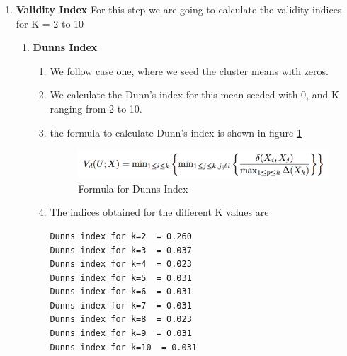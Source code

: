\documentclass[10pt, letterpaper]{article}
\begin{document}
\begin{enumerate}
\newpage

\item \textbf{Validity Index} For this step we are going to calculate the validity indices for K = 2 to 10
\begin{enumerate}

\item \textbf{Dunns Index}
\begin{enumerate}
\item We follow case one, where we seed the cluster means with zeros.
\item We calculate the Dunn's index for this mean seeded with 0, and K ranging from 2 to 10.
\item the formula to calculate Dunn's index is shown in figure \ref{fig:dunn}
 	\begin{figure}[h!]
	\centering
	\includegraphics[scale=0.75]{dunnsindex}
	\caption{Formula  for Dunns Index}
	\label {fig:dunn}
	\end{figure}
\newpage
\item The indices obtained for the different K values are
\begin{verbatim}
Dunns index for k=2  = 0.260
Dunns index for k=3  = 0.037
Dunns index for k=4  = 0.023
Dunns index for k=5  = 0.031
Dunns index for k=6  = 0.031
Dunns index for k=7  = 0.031
Dunns index for k=8  = 0.023
Dunns index for k=9  = 0.031
Dunns index for k=10  = 0.031
\end{verbatim}


\end{enumerate}
\end{enumerate}
\end{enumerate}
\end{document}
